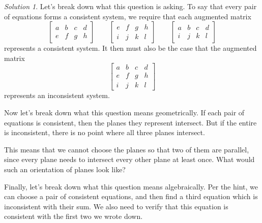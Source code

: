 \documentclass{article}
\theoremstyle{remark}
\newtheorem*{solution}{Solution}
\begin{document}
\begin{solution}
  Let's break down what this question is asking.
  To say that every pair of equations forms a consistent system, we require that each augmented matrix
  \begin{displaymath}
    \begin{bmatrix}
      a & b & c & d \\
      e & f & g & h
    \end{bmatrix}
    \qquad
    \begin{bmatrix}
      e & f & g & h \\
      i & j & k & l
    \end{bmatrix}
    \qquad
    \begin{bmatrix}
      a & b & c & d \\
      i & j & k & l
    \end{bmatrix}
  \end{displaymath}
  represents a consistent system.
  It then must also be the case that the augmented matrix
  \begin{displaymath}
    \begin{bmatrix}
      a & b & c & d \\
      e & f & g & h \\
      i & j & k & l
    \end{bmatrix}
  \end{displaymath}
  represents an inconsistent system.

  Now let's break down what this question means geometrically.
  If each pair of equations is consistent, then the planes they represent intersect.
  But if the entire is inconsistent, there is no point where all three planes intersect.

  This means that we cannot choose the planes so that two of them are parallel, since every plane needs to intersect every other plane at least once.
  What would such an orientation of planes look like?

  Finally, let's break down what this question means algebraically.
  Per the hint, we can choose a pair of consistent equations, and then find a third equation which is inconsistent with their sum.
  We also need to verify that this equation is consistent with the first two we wrote down.


\end{solution}
\end{document}
